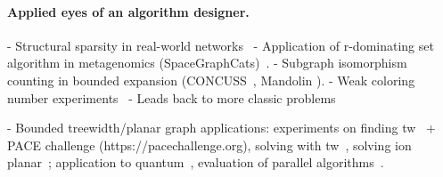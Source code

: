 \paragraph*{Applied eyes of an algorithm designer.}

- Structural sparsity in real-world networks~\cite{demaine2018sparsity}
- Application of r-dominating set algorithm in metagenomics (SpaceGraphCats)~\cite{brown2018metagenome}.
- Subgraph isomorphism counting in bounded expansion (CONCUSS~\cite{obrien2017concuss}, Mandolin ).
- Weak coloring number experiments~\cite{wojciech2018quasiwide}
- Leads back to more classic problems~\cite{kun2018lincolor}

- Bounded treewidth/planar graph applications:
experiments on finding tw~\cite{bodlaender2006-tw, koster2001-tw} + PACE challenge (https://pacechallenge.org), solving with tw~\cite{ziobro2018hamcycle-tw, alber2005vc-tw}, solving ion planar~\cite{alber2001-planar}; application to quantum~\cite{dumitrescu2018tensors}, evaluation of parallel algorithms~\cite{sullivan2013paralleltd}. 
